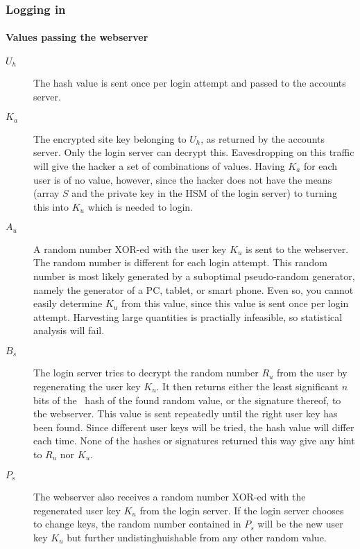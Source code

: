\subsubsection{Logging in}
\paragraph{Values passing the webserver}
\label{sec:passing_webserver}
\begin{description}
\item[$U_h$]	The hash value is sent once per login attempt and passed to the accounts server.
\item[$K_a$]	The encrypted site key belonging to $U_h$,
				as returned by the accounts server.
				Only the login server can decrypt this.
				Eavesdropping on this traffic will give the hacker a set of combinations of values.
				Having $K_a$ for each user is of no value,
				however,
				since the hacker does not have the means
				(array $S$ and the private key in the HSM of the login server)
				to turning this into $K_u$ which is needed to login.
\item[$A_u$]	A random number XOR-ed with the user key $K_u$ is sent to the webserver.
				The random number is different for each login attempt.
				This random number is most likely generated by a suboptimal pseudo-random generator,
				namely the generator of a PC, tablet, or smart phone.
				Even so, you cannot easily determine $K_u$ from this value,
				since this value is sent once per login attempt.
				Harvesting large quantities is practially infeasible,
				so statistical analysis will fail.
\item[$B_s$]	The login server tries to decrypt the random number $R_u$ from the user by regenerating the user key $K_u$.
				It then returns either the least significant $n$ bits of the \SHA\ hash of the found random value,
				or the signature thereof,
				to the webserver.
				\newline
				This value is sent repeatedly until the right user key has been found.
				Since different user keys will be tried, the hash value will differ each time.
				None of the hashes or signatures returned this way give any hint to $R_u$ nor $K_u$.
\item[$P_s$]	The webserver also receives a random number XOR-ed with the regenerated user key $K_u$ from the login server.
				If the login server chooses to change keys,
				the random number contained in $P_s$ will be the new user key $K_u$
				but further undistinghuishable from any other random value.

\end{description}
